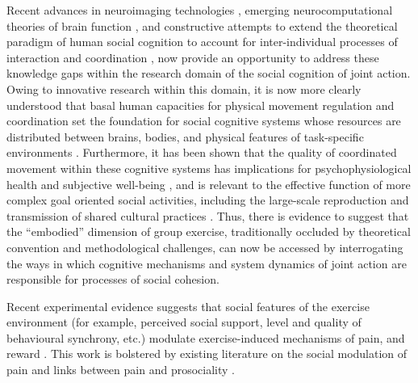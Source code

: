 Recent advances in neuroimaging technologies \citep{Frith2007}, emerging neurocomputational theories of brain function \citep{Friston2010,Frith2010,Clark2013}, and constructive attempts to extend the theoretical paradigm of human social cognition to account for inter-individual processes of interaction and coordination \citep{Sebanz2006,Dale2014}, now provide an opportunity to address these knowledge gaps within the research domain of the social cognition of joint action.  Owing to innovative research within this domain, it is now more clearly understood that basal human capacities for physical movement regulation and coordination set the foundation for social cognitive systems whose resources are distributed between brains, bodies, and physical features of task-specific environments \citep{Hutchins2000,Kirsh2006,Semin2008,Semin2012,Coey2012}.
Furthermore, it has been shown that the quality of coordinated movement within these cognitive systems has implications for psychophysiological health and subjective well-being \citep{Wheatley2012}, and is relevant to the effective function of more complex goal oriented social activities, including the large-scale reproduction and transmission of shared cultural practices \citep{Dunbar2012,Roepstorff2010,Claidiere2014,Launay2016}. Thus, there is evidence to suggest that the ``embodied'' dimension of group exercise, traditionally occluded by theoretical convention and methodological challenges, can now be accessed by  interrogating the ways in which cognitive mechanisms and system dynamics of joint action are responsible for processes of social cohesion.


  Recent experimental evidence suggests that social features of the exercise environment (for example, perceived social support, level and quality of behavioural synchrony, etc.) modulate exercise-induced mechanisms of pain, and reward \citep{Cohen2009,Sullivan2014,Tarr2015,Davis2015,Weinstein2016}. This work is bolstered by existing literature on the social modulation of pain \citep{Eisenberger2012a} and links between pain and prosociality \citep{Bastian2014a}.












